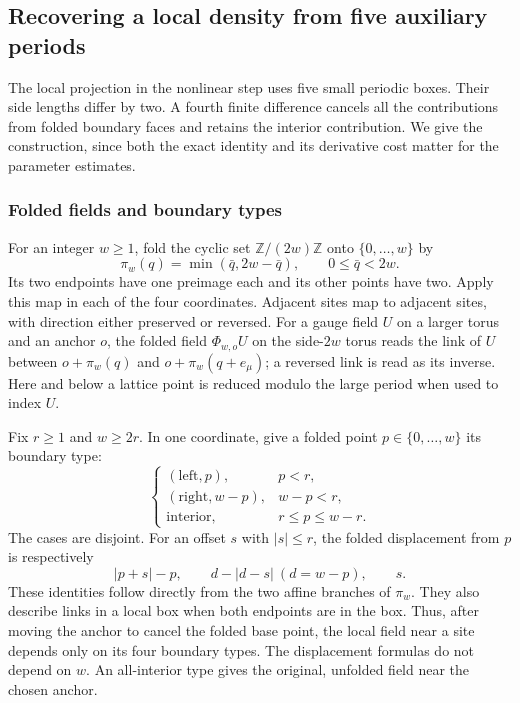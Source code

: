 \subsection{Recovering a local density from five auxiliary periods}
\label{sec:five-period-localization}
The local projection in the nonlinear step uses five small periodic
boxes. Their side lengths differ by two. A fourth finite difference
cancels all the contributions from folded boundary faces and retains
the interior contribution. We give the construction, since both the
exact identity and its derivative cost matter for the parameter
estimates.

\subsubsection{Folded fields and boundary types}
For an integer $w\ge1$, fold the cyclic set $\mathbb Z/(2w)\mathbb Z$
onto $\{0,\ldots,w\}$ by
\[
       \pi_w(q)=\min(\bar q,2w-\bar q),\qquad 0\le\bar q<2w.
\]
Its two endpoints have one preimage each and its other points have
two. Apply this map in each of the four coordinates. Adjacent sites
map to adjacent sites, with direction either preserved or reversed.
For a gauge field $U$ on a larger torus and an anchor $o$, the
folded field $\Phi_{w,o}U$ on the side-$2w$ torus reads the link
of $U$ between $o+\pi_w(q)$ and $o+\pi_w(q+e_\mu)$; a reversed
link is read as its inverse. Here and below a lattice point is
reduced modulo the large period when used to index $U$.

Fix $r\ge1$ and $w\ge2r$. In one coordinate, give a folded point
$p\in\{0,\ldots,w\}$ its boundary type:
\[
 \begin{cases}
  (\mathrm{left},p),&p<r,\\
  (\mathrm{right},w-p),&w-p<r,\\
  \mathrm{interior},&r\le p\le w-r.
 \end{cases}
\]
The cases are disjoint. For an offset $s$ with $|s|\le r$,
the folded displacement from $p$ is respectively
\begin{equation}\label{eq:five-period-displacement}
 |p+s|-p,\qquad d-|d-s|\ (d=w-p),\qquad s.
\end{equation}
These identities follow directly from the two affine branches of
$\pi_w$. They also describe links in a local box when both endpoints
are in the box. Thus, after moving the anchor to cancel the folded
base point, the local field near a site depends only on its four
boundary types. The displacement formulas do not depend on $w$.
An all-interior type gives the original, unfolded field near the
chosen anchor.


